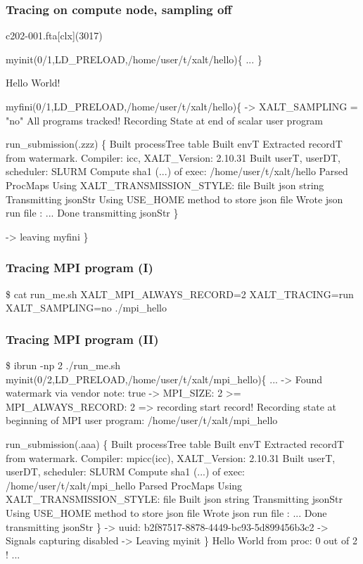 \documentclass{beamer}
\begin{document}
\begin{frame}[fragile]
    \frametitle{Tracing on compute node, sampling off}
 {\tiny
    \begin{semiverbatim}
c202-001.fta[clx](3017)%

myinit(0/1,LD\_PRELOAD,/home/user/t/xalt/hello)\{
  ...
\}

Hello World!

myfini(0/1,LD\_PRELOAD,/home/user/t/xalt/hello)\{
    -> XALT\_SAMPLING = "no" All programs tracked!
  Recording State at end of scalar user program

  run\_submission(.zzz) \{
    Built processTree table
    Built envT
    Extracted recordT from watermark. Compiler: icc, XALT\_Version: 2.10.31
    Built userT, userDT, scheduler: SLURM
    Compute sha1 (...) of exec: /home/user/t/xalt/hello
    Parsed ProcMaps
    Using XALT\_TRANSMISSION\_STYLE: file
    Built json string
    Transmitting jsonStr
    Using USE\_HOME method to store json file
    Wrote json run file : ...
    Done transmitting jsonStr
  \}

    -> leaving myfini
\}
   \end{semiverbatim}
}
\end{frame}

\begin{frame}[fragile]
    \frametitle{Tracing MPI program (I)}
 {\tiny
    \begin{semiverbatim}
\$ cat run_me.sh
XALT_MPI_ALWAYS_RECORD=2 XALT_TRACING=run XALT_SAMPLING=no ./mpi_hello
    \end{semiverbatim}
  }
\end{frame}

\begin{frame}[fragile]
    \frametitle{Tracing MPI program (II)}
 {\tiny
    \begin{semiverbatim}
\$ ibrun -np 2 ./run\_me.sh
myinit(0/2,LD\_PRELOAD,/home/user/t/xalt/mpi\_hello)\{
  ...
    -> Found watermark via vendor note: true
    -> MPI\_SIZE: 2 >= MPI\_ALWAYS\_RECORD: 2 => recording start record!
  Recording state at beginning of MPI user program:
    /home/user/t/xalt/mpi\_hello

  run\_submission(.aaa) \{
    Built processTree table
    Built envT
    Extracted recordT from watermark. Compiler: mpicc(icc), XALT\_Version: 2.10.31
    Built userT, userDT, scheduler: SLURM
    Compute sha1 (...) of exec: /home/user/t/xalt/mpi\_hello
    Parsed ProcMaps
    Using XALT\_TRANSMISSION\_STYLE: file
    Built json string
    Transmitting jsonStr
    Using USE\_HOME method to store json file
    Wrote json run file : ...
    Done transmitting jsonStr
  \}
    -> uuid: b2f87517-8878-4449-bc93-5d899456b3c2
    -> Signals capturing disabled
    -> Leaving myinit
\}
Hello World from proc: 0 out of 2 !
...
   \end{semiverbatim}
}
\end{frame}
\end{document}
